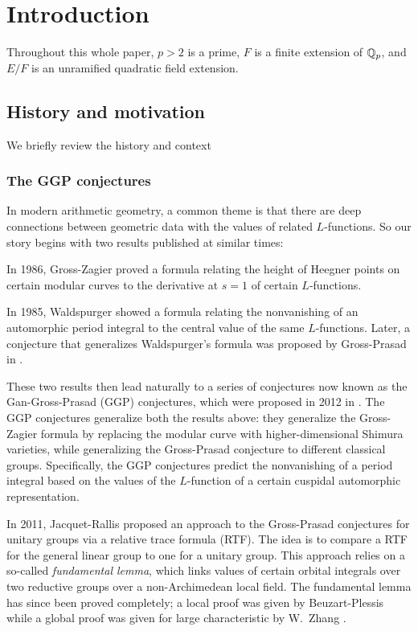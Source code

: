\section{Introduction}
Throughout this whole paper, $p > 2$ is a prime,
$F$ is a finite extension of $\mathbb Q_p$,
and $E/F$ is an unramified quadratic field extension.

\subsection{History and motivation}
We briefly review the history and context

\subsubsection{The GGP conjectures}
In modern arithmetic geometry, a common theme is that there are deep connections
between geometric data with the values of related $L$-functions.
So our story begins with two results published at similar times:
\begin{itemize}
  \ii In 1986, Gross-Zagier \cite{ref:gross_zagier} proved a formula
  relating the height of Heegner points
  on certain modular curves to the derivative at $s=1$ of certain $L$-functions.

  \ii In 1985, Waldspurger \cite{ref:waldspurger} showed a formula
  relating the nonvanishing of an automorphic period integral
  to the central value of the same $L$-functions.
  Later, a conjecture that generalizes Waldspurger's formula
  was proposed by Gross-Prasad in \cite{ref:GP1,ref:GP2}.
\end{itemize}
These two results then lead naturally to a series of conjectures
now known as the Gan-Gross-Prasad (GGP) conjectures,
which were proposed in 2012 in \cite{ref:GGP}.
The GGP conjectures generalize both the results above:
they generalize the Gross-Zagier formula by replacing the modular curve
with higher-dimensional Shimura varieties,
while generalizing the Gross-Prasad conjecture to different classical groups.
Specifically, the GGP conjectures predict the nonvanishing of a period integral
based on the values of the $L$-function of a certain cuspidal automorphic representation.

In 2011, Jacquet-Rallis \cite{ref:JR} proposed an approach to the Gross-Prasad conjectures
for unitary groups via a relative trace formula (RTF).
The idea is to compare a RTF for the general linear group to one for a unitary group.
This approach relies on a so-called \emph{fundamental lemma},
which links values of certain orbital integrals
over two reductive groups over a non-Archimedean local field.
The fundamental lemma has since been proved completely;
a local proof was given by Beuzart-Plessis \cite{ref:BeuzartPlessis}
while a global proof was given for large characteristic by W.\ Zhang \cite{ref:Wei2021}.

